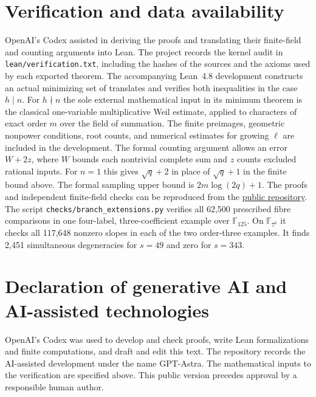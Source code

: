 \documentclass[preprint,12pt,numbers]{elsarticle}
\begin{document}
\section*{Verification and data availability}
OpenAI's Codex assisted in deriving the proofs and translating their
finite-field and counting arguments into Lean. The project records
the kernel audit in \texttt{lean/verification.txt}, including the
hashes of the sources and the axioms used by each exported theorem.
The accompanying Lean~4.8 development constructs an actual minimizing
set of translates and verifies both inequalities in the case $h\mid n$.
For $h\nmid n$ the sole external mathematical input in its minimum
theorem is the classical one-variable multiplicative Weil estimate,
applied to characters of exact order $m$ over the field of summation.
The finite preimages, geometric nonpower conditions, root counts, and
numerical estimates for growing $\ell$ are included in the development.
The formal counting argument allows an error $W+2z$, where $W$ bounds
each nontrivial complete sum and $z$ counts excluded rational inputs.
For $n=1$ this gives $\sqrt q+2$ in place of $\sqrt q+1$ in the finite
bound above. The formal sampling upper bound is $2m\log(2q)+1$.
The proofs and independent finite-field checks can be
reproduced from the
\href{https://github.com/Heinz1729/monomial-blocking-curves}{public repository}.
The script \texttt{checks/branch\_extensions.py} verifies all 62,500
prescribed fibre comparisons in one four-label, three-coefficient
example over $\mathbb F_{125}$. On $\mathbb F_{7^6}$ it checks all
117,648 nonzero slopes in each of the two order-three examples. It finds
2,451 simultaneous degeneracies for $s=49$ and zero for $s=343$.

\section*{Declaration of generative AI and AI-assisted technologies}
OpenAI's Codex was used to develop and check proofs, write Lean
formalizations and finite computations, and draft and edit this text.
The repository records the AI-assisted development under the name
GPT-Astra. The mathematical inputs to the verification are specified
above. This public version precedes approval by a responsible human author.
\end{document}

